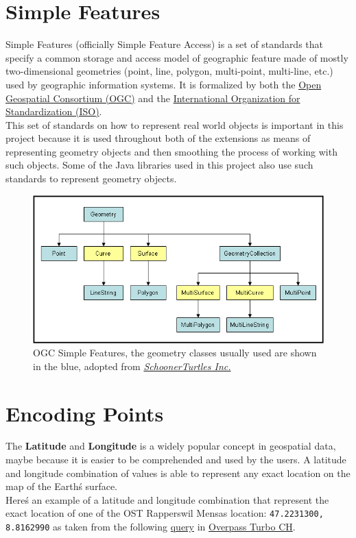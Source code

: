 \section{Simple Features}
Simple Features (officially Simple Feature Access) is a set of standards that specify
a common storage and access model of geographic feature made of mostly
two-dimensional geometries (point, line, polygon, multi-point, multi-line, etc.)
used by geographic information systems.
It is formalized by both the \href{https://www.ogc.org/}{Open Geospatial Consortium (OGC)} and the
\href{https://www.iso.org/home.html}{International Organization for Standardization (ISO)}. \cite{SimpleFeaturesWiki}\\
\newline
This set of standards on how to represent real world objects is important in this project because it is used throughout
both of the extensions as means of representing geometry objects and then smoothing the process of working with such objects.
Some of the Java libraries used in this project also use such standards to represent geometry objects.
\begin{figure}[H]
    \centering
    \includegraphics[width=\linewidth]{./Figures/Spatial_Data/simple_features.png}
    \caption{OGC Simple Features, the geometry classes usually used are shown in the blue, adopted from \href{http://gsp.humboldt.edu/Websites/BlueSpray/STUsersGuide/Scripting/Script_SimpleFeatures.html}{\textit{SchoonerTurtles Inc.}} \cite{SchoonerTurtles}}
\end{figure}
\section{Encoding Points}
The \textbf{Latitude} and \textbf{Longitude} is a widely popular concept in geospatial data, maybe because it is easier
to be comprehended and used by the users. A latitude and longitude combination of values is able to represent any exact location on the map
of the Earth\'s surface.\\
\newline
Here\'s an example of a latitude and longitude combination that represent the exact location of one of the OST Rapperswil
Mensas location: \texttt{47.2231300, 8.8162990} as taken from the following
\href{http://overpass-turbo.osm.ch/?Q=area%0A%20%20%5B%22name%22%3D%22Rapperswil-Jona%22%5D-%3E.a%3B%0A(%0A%09nwr%0A%20%20%20%20(area.a)%0A%20%20%20%20%5B%22name%22%3D%22Mensa%20OST%20Campus%20Rapperswil%20Jona%22%5D%3B%0A)%3B%0Aout%20center%3B&C=47.22281;8.81693;19}{query} in
\href{http://overpass-turbo.osm.ch/}{Overpass Turbo CH}.
